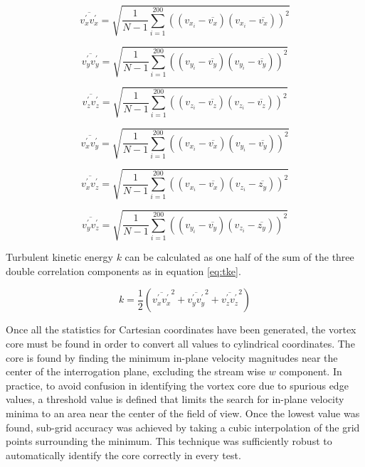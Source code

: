 \begin{equation}
\overline{v_x^\prime v_x^\prime} = \sqrt{\frac{1}{N-1} \sum_{i=1}^{200} 
	((v_{x_i} - \overline{v_x})(v_{x_i} - \overline{v_x}))^2}
\label{eq:rs_uu}
\end{equation}

\begin{equation}
\overline{v_y^\prime v_y^\prime} = \sqrt{\frac{1}{N-1} \sum_{i=1}^{200} 
	((v_{y_i} - \overline{v_y})(v_{y_i} - \overline{v_y}))^2}
\end{equation}

\begin{equation}
\overline{v_z^\prime v_z^\prime} = \sqrt{\frac{1}{N-1} \sum_{i=1}^{200} 
	((v_{z_i} - \overline{v_z})(v_{z_i} - \overline{v_z}))^2}
\end{equation}

\begin{equation}
\overline{v_x^\prime v_y^\prime} = \sqrt{\frac{1}{N-1} \sum_{i=1}^{200} 
	((v_{x_i} - \overline{v_x})(v_{y_i} - \overline{v_y}))^2}
\end{equation}

\begin{equation}
\overline{v_x^\prime v_z^\prime} = \sqrt{\frac{1}{N-1} \sum_{i=1}^{200} 
	((v_{x_i} - \overline{v_x})(v_{z_i} - \overline{z_y}))^2}
\end{equation}

\begin{equation}
\overline{v_y^\prime v_z^\prime} = \sqrt{\frac{1}{N-1} \sum_{i=1}^{200} 
	((v_{y_i} - \overline{v_y})(v_{z_i} - \overline{z_y}))^2}
\label{eq:rs_vw}
\end{equation}

Turbulent kinetic energy $k$ can be calculated as one half 
of the sum of the three double correlation components as in equation 
\ref{eq:tke}.

\begin{equation}
k = \frac{1}{2} \left(\overline{v_x^\prime v_x^\prime}^2 + 
	\overline{v_y^\prime v_y^\prime}^2 + 
	\overline{v_z^\prime v_z^\prime}^2\right)
\label{eq:tke}
\end{equation}


Once all the statistics for Cartesian coordinates have been generated, the 
vortex core must be found in order to convert all values to cylindrical 
coordinates. The core is found by finding the minimum in-plane velocity 
magnitudes near the center of the interrogation plane, excluding the stream 
wise $w$ component. In practice, to avoid confusion in identifying the vortex 
core due to spurious edge values, a threshold value is defined that limits the 
search for in-plane velocity minima to an area near the center of the field of 
view. Once the lowest value was found, sub-grid accuracy was 
achieved by taking a cubic interpolation of the grid points surrounding the 
minimum. This technique was sufficiently robust to automatically identify the 
core correctly in every test.

